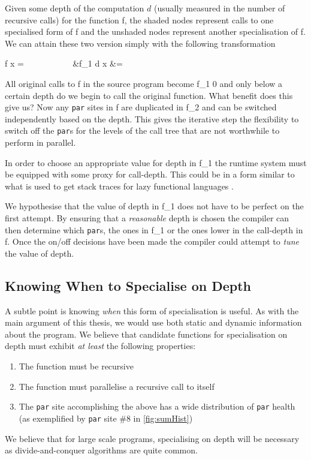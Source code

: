 Given some depth of the computation $d$ (usually measured in the number of
recursive calls) for the function \<f\>, the shaded nodes represent calls to one
specialised form of \<f\> and the unshaded nodes represent another specialisation
of \<f\>. We can attain these two version simply with the following transformation

\begin{haskell}
f x =  \(\phantom{space}\) \Longrightarrow
\(\phantom{space}\) &f_{1} d x &=  \\
\end{haskell}

All original calls to \<f\> in the source program become \<f_{1} 0\> and only
below a certain depth do we begin to call the original function. What benefit does
this give us? Now any \verb|par| sites in \<f\> are duplicated in \<f_{2}\>
and can be switched independently based on the depth. This gives the iterative
step the flexibility to switch off the \verb|par|s for the levels of the call
tree that are not worthwhile to perform in parallel.

In order to choose an appropriate value for \<depth\> in \<f_{1}\> the runtime
system must be equipped with some proxy for call-depth. This could be in a form
similar to what is used to get stack traces for lazy functional languages
\citep{AllwoodStack}.

We hypothesise that the value of \<depth\> in \<f_{1}\> does not have to be
perfect on the first attempt. By ensuring that a \emph{reasonable} \<depth\> is
chosen the compiler can then determine which \verb|par|s, the ones in \<f_{1}\>
or the ones lower in the call-depth in \<f\>. Once the on/off decisions have
been made the compiler could attempt to \emph{tune} the value of \<depth\>.

\subsection{Knowing When to Specialise on Depth}

A subtle point is knowing \emph{when} this form of specialisation is useful.
As with the main argument of this thesis, we would use both static and dynamic
information about the program.  We believe that candidate functions for
specialisation on depth must exhibit \emph{at least} the following properties:

\begin{enumerate}
    \item The function must be recursive
    \item The function must parallelise a recursive call to itself
    \item The \verb|par| site accomplishing the above has a wide distribution
            of \verb|par| health (as exemplified by \verb|par| site \#8 in
            \ref{fig:sumHist})
\end{enumerate}

We believe that for large scale programs, specialising on depth will be
necessary as divide-and-conquer algorithms are quite common.
